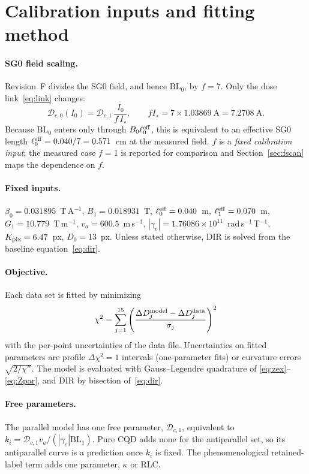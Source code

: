 \documentclass[11pt,a4paper]{article}
\newcommand{\D}{\mathcal{D}}
\newcommand{\DIR}{\mathrm{DIR}}
\newcommand{\RLC}{\mathrm{RLC}}
\newcommand{\BL}{\mathrm{BL}}
\begin{document}
\section{Calibration inputs and fitting method}
\label{sec:method}

\paragraph{SG0 field scaling.} Revision~F divides the SG0 field, and hence $\BL_0$, by $f=7$. Only the
dose link~\eqref{eq:link} changes:
\begin{equation}
\D_{c,0}(I_0)=\D_{c,1}\,\frac{I_0}{f\,I_\star},\qquad fI_\star=7\times1.03869~\text{A}=7.2708~\text{A}.
\end{equation}
Because $\BL_0$ enters only through $B_0\ell_0^{\rm eff}$, this is equivalent to an effective SG0 length
$\ell_0^{\rm eff}=0.040/7=0.571$~cm at the measured field. $f$ is a \emph{fixed calibration input}; the
measured case $f=1$ is reported for comparison and Section~\ref{sec:fscan} maps the dependence on $f$.

\paragraph{Fixed inputs.} $\beta_0=0.031895$~T\,A$^{-1}$, $B_1=0.018931$~T, $\ell_0^{\rm eff}=0.040$~m,
$\ell_1^{\rm eff}=0.070$~m, $G_1=10.779$~T\,m$^{-1}$, $v_a=600.5$~m\,s$^{-1}$,
$|\gamma_e|=1.76086\times10^{11}$~rad\,s$^{-1}$\,T$^{-1}$, $K_{\rm pix}=6.47$~px, $D_0=13$~px. Unless
stated otherwise, $\DIR$ is solved from the baseline equation~\eqref{eq:dir}.

\paragraph{Objective.} Each data set is fitted by minimizing
\begin{equation}
\chi^2=\sum_{j=1}^{15}\left(\frac{\Delta D_j^{\rm model}-\Delta D_j^{\rm data}}{\sigma_j}\right)^2
\end{equation}
with the per-point uncertainties of the data file. Uncertainties on fitted parameters are profile
$\Delta\chi^2=1$ intervals (one-parameter fits) or curvature errors $\sqrt{2/\chi''}$. The model is
evaluated with Gauss--Legendre quadrature of \eqref{eq:zex}--\eqref{eq:Zpar}, and $\DIR$ by bisection
of~\eqref{eq:dir}.

\paragraph{Free parameters.} The parallel model has one free parameter, $\D_{c,1}$, equivalent to
$k_i=\D_{c,1}v_a/(|\gamma_e|\BL_1)$. Pure CQD adds none for the antiparallel set, so its antiparallel
curve is a prediction once $k_i$ is fixed. The phenomenological retained-label term adds one
parameter, $\kappa$ or $\RLC$.
\end{document}
